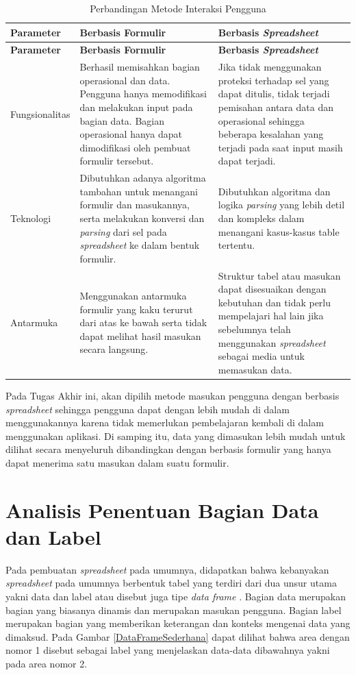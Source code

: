 	\begin{small}
	\begin{longtable}{ | p{3cm} | p{4cm} | p{4cm} | }
	    \caption{Perbandingan Metode Interaksi Pengguna}
	    \label{ModelInteraksi}\\ \hline
	    \centering\bfseries{Parameter} & \centering\bfseries{Berbasis Formulir} & \centering\bfseries{Berbasis \textit{Spreadsheet}} \tabularnewline \hline
	    \endfirsthead
	    \hline
	    \centering\bfseries{Parameter} & \centering\bfseries{Berbasis Formulir} & \centering\bfseries{Berbasis \textit{Spreadsheet}} \tabularnewline \hline
	    \endhead
	    Fungsionalitas & Berhasil memisahkan bagian operasional dan data. Pengguna hanya memodifikasi dan melakukan input pada bagian data. Bagian operasional hanya dapat dimodifikasi oleh pembuat formulir tersebut. & Jika tidak menggunakan proteksi terhadap sel yang dapat ditulis, tidak terjadi pemisahan antara data dan operasional sehingga beberapa kesalahan yang terjadi pada saat input masih dapat terjadi. \\ \hline
	    Teknologi & Dibutuhkan adanya algoritma tambahan untuk menangani formulir dan masukannya, serta melakukan konversi dan \textit{parsing} dari sel pada \textit{spreadsheet} ke dalam bentuk formulir. & Dibutuhkan algoritma dan logika \textit{parsing} yang lebih detil dan kompleks dalam menangani kasus-kasus table tertentu. \\ \hline
	    Antarmuka & Menggunakan antarmuka formulir yang kaku terurut dari atas ke bawah serta tidak dapat melihat hasil masukan secara langsung. & Struktur tabel atau masukan dapat disesuaikan dengan kebutuhan dan tidak perlu mempelajari hal lain jika sebelumnya telah menggunakan \textit{spreadsheet} sebagai media untuk memasukan data. \\ \hline
  	\end{longtable}
	\end{small}

  	Pada Tugas Akhir ini, akan dipilih metode masukan pengguna dengan berbasis \textit{spreadsheet} sehingga pengguna dapat dengan lebih mudah di dalam menggunakannya karena tidak memerlukan pembelajaran kembali di dalam menggunakan aplikasi. Di samping itu, data yang dimasukan lebih mudah untuk dilihat secara menyeluruh dibandingkan dengan berbasis formulir yang hanya dapat menerima satu masukan dalam suatu formulir.

\section{Analisis Penentuan Bagian Data dan Label}
Pada pembuatan \textit{spreadsheet} pada umumnya, didapatkan bahwa kebanyakan \textit{spreadsheet} pada umumnya berbentuk tabel yang terdiri dari dua unsur utama yakni data dan label atau disebut juga tipe \textit{data frame} \citep{Chen2013}. Bagian data merupakan bagian yang biasanya dinamis dan merupakan masukan pengguna. Bagian label merupakan bagian yang memberikan keterangan dan konteks mengenai data yang dimaksud. Pada Gambar \ref{DataFrameSederhana} dapat dilihat bahwa area dengan nomor 1 disebut sebagai label yang menjelaskan data-data dibawahnya yakni pada area nomor 2.

